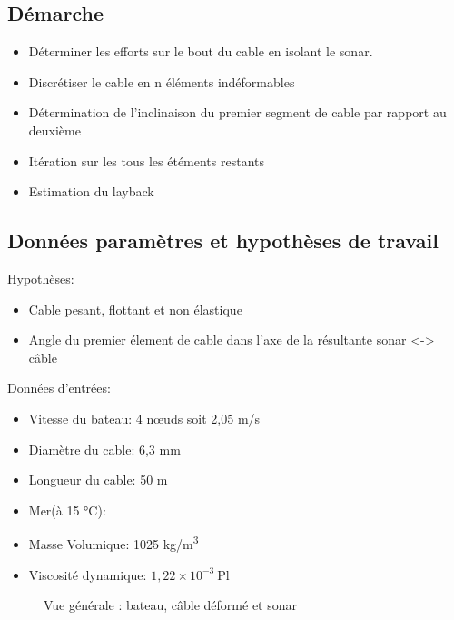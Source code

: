 \documentclass[12pt,a4paper]{report}
\begin{document}
\subsection{Démarche}

\begin{itemize}

  \item Déterminer les efforts sur le bout du cable en isolant le sonar.
  \item Discrétiser le cable en n éléments indéformables
  \item Détermination de l'inclinaison du premier segment de cable par rapport au deuxième
  \item Itération sur les tous les étéments restants
  \item Estimation du layback


\end{itemize}

\subsection{Données paramètres et hypothèses de travail}

Hypothèses:
\begin{itemize}
  \item Cable pesant, flottant et non élastique
  \item Angle du premier élement de cable dans l'axe de la résultante sonar <-> câble
\end{itemize}
Données d'entrées:
\begin{itemize}
  \item Vitesse du bateau: 4 nœuds soit 2,05 m/s
  \item Diamètre du cable: 6,3 mm
  \item Longueur du cable: 50 m
  \item Mer(à 15 °C):
  \item Masse Volumique: 1025 kg/m\textsuperscript{3}
  \item Viscosité dynamique: \( 1{,}22 \times 10^{-3}~\text{Pl} \)
\end{itemize}

\begin{figure}[H]
\centering
{}
\caption{Vue générale : bateau, câble déformé et sonar}
\end{figure}
\end{document}
